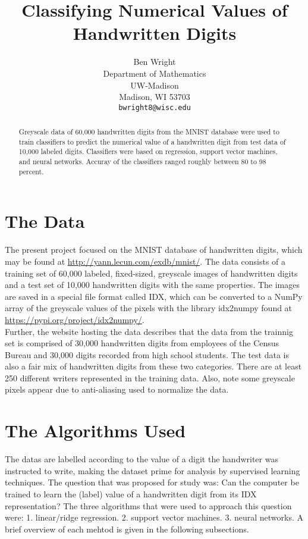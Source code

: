 \documentclass{article}
\title{Classifying Numerical Values of Handwritten Digits}
\author{
  Ben Wright \\
  Department of Mathematics\\
  UW-Madison\\
  Madison, WI 53703 \\
  \texttt{bwright8@wisc.edu} \\
}
\begin{document}
\maketitle

\begin{abstract}
  Greyscale data of 60,000 handwritten digits from the MNIST database were used to train classifiers to predict the numerical value of a handwritten digit from test data of 10,000 labeled digits. Classifiers were based on regression, support vector machines, and neural networks. Accuray of the classifiers ranged roughly between 80 to 98 percent.
\end{abstract}

\section{The Data}

The present project focused on the MNIST database of handwritten digits, which may be found at \url{http://yann.lecun.com/exdb/mnist/}. The data consists of  a training set of 60,000 labeled, fixed-sized, greyscale images of handwritten digits and a test set of 10,000 handwritten digits with the same properties. The images are saved in a special file format called IDX, which can be converted to a NumPy array of the greyscale values of the pixels with the library idx2numpy found at \url{https://pypi.org/project/idx2numpy/}. \\


Further, the website hosting the data describes that the data from the trainnig set is comprised of 30,000 handwritten digits from employees of the Census Bureau and 30,000 digits recorded from high school students. The test data is also a fair mix of handwritten digits from these two categories. There are at least 250 different writers represented in the training data. Also, note some greyscale pixels appear due to anti-aliasing used to normalize the data. 


\section{The Algorithms Used}

The datas are labelled according to the value of a digit the handwriter was instructed to write, making the dataset prime for analysis by supervised learning techniques. The question that was proposed for study was: Can the computer be trained to learn the (label) value of a handwritten digit from its IDX representation? The three algorithms that were used to approach this question were: 1. linear/ridge regression. 2. support vector machines. 3. neural networks. A brief overview of each mehtod is given in the following subsections. 
\end{document}
